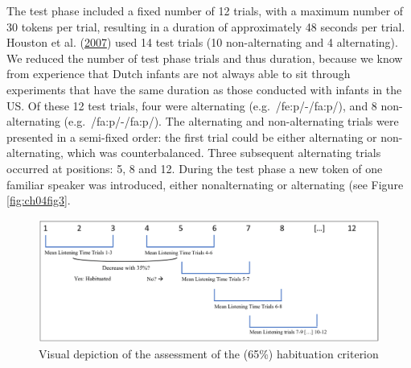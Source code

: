 \documentclass[openright,titlepage,12pt,a4paper]{book}
\begin{document}
The test phase included a fixed number of 12 trials, with a maximum number of 30 tokens per trial, resulting in a duration of approximately 48 seconds per trial. Houston et al. (\protect\hyperlink{ref-houston_assessing_2007}{2007}) used 14 test trials (10 non-alternating and 4 alternating). We reduced the number of test phase trials and thus duration, because we know from experience that Dutch infants are not always able to sit through experiments that have the same duration as those conducted with infants in the US. Of these 12 test trials, four were alternating (e.g.~/fe:p/-/fa:p/), and 8 non-alternating (e.g.~/fa:p/-/fa:p/). The alternating and non-alternating trials were presented in a semi-fixed order: the first trial could be either alternating or non-alternating, which was counterbalanced. Three subsequent alternating trials occurred at positions: 5, 8 and 12. During the test phase a new token of one familiar speaker was introduced, either nonalternating
or alternating (see Figure \ref{fig:ch04fig3}.

\begin{figure}

{\centering \includegraphics[width=0.9\linewidth]{figures/chapter_4/Figure2} 

}

\caption{Visual depiction of the assessment of the (65\%) habituation criterion}\label{fig:ch04fig2}
\end{figure}
\end{document}
